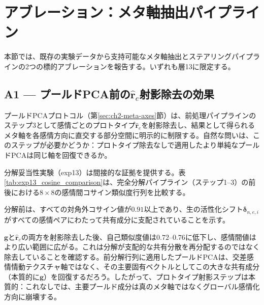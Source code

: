\section{アブレーション：メタ軸抽出パイプライン}
\label{app:ablation}

本節では、既存の実験データから支持可能なメタ軸抽出とステアリングパイプラインの2つの標的アブレーションを報告する。いずれも層13に限定する。

\subsection*{A1 --- プールドPCA前の\texorpdfstring{$\hat{\mathbf{r}}_e$}{r\_e}射影除去の効果}

プールドPCAプロトコル（第\ref{sec:ch2-meta-axes}節）は、前処理パイプラインのステップ3として感情ごとのプロトタイプ$\hat{\mathbf{r}}_e$を射影除去し、結果として得られるメタ軸を各感情方向に直交する部分空間に明示的に制限する。自然な問いは、このステップが必要かどうか：プロトタイプ除去なしで適用したより単純なプールドPCAは同じ軸を回復できるか。

分解妥当性実験（exp13）は間接的な証拠を提供する。表\ref{tab:exp13_cosine_comparison}は、完全分解パイプライン（ステップ1--3）の前後における$8 \times 8$の感情間コサイン類似度行列を比較する。\par

分解前は、すべての対角外コサイン値が$0.91$以上であり、生の活性化シフト$\boldsymbol{\delta}_{n,e,i}$がすべての感情ペアにわたって共有成分に支配されていることを示す。\par

$\mathbf{g}$と$\hat{\mathbf{r}}_e$の両方を射影除去した後、自己類似度値は$0.72$--$0.76$に低下し、感情間値はより広い範囲に広がる。これは分解が支配的な共有分散を再分配するのではなく除去していることを確認する。前分解行列に適用したプールドPCAは、交差感情情動テクスチャ軸ではなく、その主要固有ベクトルとしてこの大きな共有成分（本質的に$\mathbf{g}$）を回復するだろう。したがって、プロトタイプ射影ステップは本質的：これなしでは、主要プールド成分は真のメタ軸ではなくグローバル感情化方向に崩壊する。

